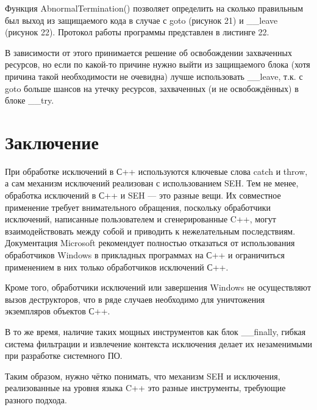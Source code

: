 \documentclass[a4paper, 12pt]{report}		%
\begin{document}
Функция AbnormalTermination() позволяет определить на сколько правильным был выход из защищаемого кода в случае с goto (рисунок 21) и \_\_leave (рисунок 22). Протокол работы программы представлен в листинге 22.
\newpage

В зависимости от этого принимается решение об освобождении захваченных ресурсов, но если по какой-то причине нужно выйти из защищаемого блока (хотя причина такой необходимости не очевидна) лучше использовать \_\_leave, т.к. с goto больше шансов на утечку ресурсов, захваченных (и не освобождённых) в блоке \_\_try.




\chapter*{Заключение}

\vspace{3em}
При обработке исключений в С++ используются ключевые слова catch и throw, а сам механизм исключений реализован с использованием SEH. Тем не менее, обработка исключений в С++ и SEH — это разные вещи. Их совместное применение требует внимательного обращения, поскольку обработчики исключений, написанные пользователем и сгенерированные C++, могут взаимодействовать между собой и приводить к нежелательным последствиям. Документация Microsoft рекомендует полностью отказаться от использования обработчиков Windows в прикладных программах на С++ и ограничиться применением в них только обработчиков исключений С++.

\vspace{2em}
Кроме того, обработчики исключений или завершения Windows не осуществляют вызов деструкторов, что в ряде случаев необходимо для уничтожения экземпляров объектов С++.

\vspace{2em}
В то же время, наличие таких мощных инструментов как блок \_\_finally, гибкая система фильтрации и извлечение контекста исключения делает их незаменимыми при разработке системного ПО.

\vspace{2em}
Таким образом, нужно чётко понимать, что механизм SEH и исключения, реализованные на уровня языка C++ это разные инструменты, требующие разного подхода.
\end{document}
